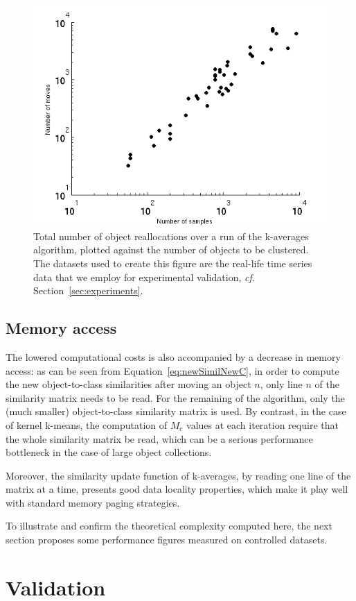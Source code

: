 \documentclass[twoside,11pt]{article}
\begin{document}
\begin{figure}
\center
\includegraphics[width = .65\textwidth]{figures/sampleMove.png} 
\caption{Total number of object reallocations over a run of the k-averages algorithm, plotted against the number of objects to be clustered. The datasets used to create this figure are the real-life time series data that we employ for experimental validation, \textit{cf.} Section~\ref{sec:experiments}.}
\label{fig:totalMoved}
\end{figure}

\subsection{Memory access}

The lowered computational costs is also accompanied by a decrease in memory access: as can be seen from Equation~\ref{eq:newSimilNewC}, in order to compute the new object-to-class similarities after moving an object $n$, only line $n$ of the similarity matrix needs to be read. For the remaining of the algorithm, only the (much smaller) object-to-class similarity matrix is used. By contrast, in the case of kernel k-means, the computation of $M_c$ values at each iteration require that the whole similarity matrix be read, which can be a serious performance bottleneck in the case of large object collections.

Moreover, the similarity update function of k-averages, by reading one line of the matrix at a time, presents good data locality properties, which make it play well with standard memory paging strategies.

To illustrate and confirm the theoretical complexity computed here, the next section proposes some performance figures measured on controlled datasets.

\section{Validation}
\label{sec:validation}
\end{document}
